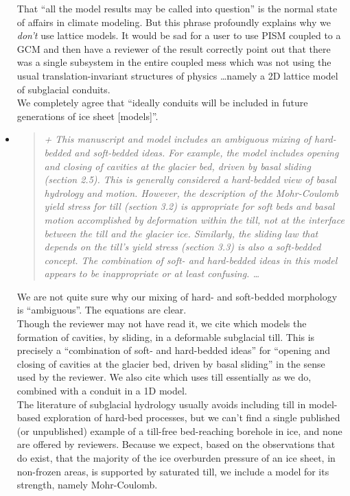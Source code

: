 \documentclass[11pt,reqno]{amsart}
\newcommand{\reply}[2]{
\medskip\medskip
\item  \begin{quote}
\emph{#1}
\end{quote}

\medskip
\noindent #2}
\begin{document}
\begin{itemize}
{\indent That ``all the model results may be called into question'' is the normal state of affairs in climate modeling.  But this phrase profoundly explains why we \emph{don't} use lattice models.  It would be sad for a user to use PISM coupled to a GCM and then have a reviewer of the result correctly point out that there was a single subsystem in the entire coupled mess which was not using the usual translation-invariant structures of physics \dots namely a 2D lattice model of subglacial conduits.\\
\indent We completely agree that ``ideally conduits will be included in future
generations of ice sheet [models]''.}

\reply{+ This manuscript and model includes an ambiguous mixing of hard-bedded and soft-bedded ideas. For example, the model includes opening and closing of cavities at
the glacier bed, driven by basal sliding (section 2.5).  This is generally considered
a hard-bedded view of basal hydrology and motion.  However, the description of the
Mohr-Coulomb yield stress for till (section 3.2) is appropriate for soft beds and basal
motion accomplished by deformation \emph{within} the till, not at the interface between the
till and the glacier ice. Similarly, the sliding law that depends on the till's yield stress
(section 3.3) is also a soft-bedded concept. The combination of soft- and hard-bedded
ideas in this model appears to be inappropriate or at least confusing. \dots}
{We are not quite sure why our mixing of hard- and soft-bedded morphology is ``ambiguous''.  The equations are clear.\\
\indent Though the reviewer may not have read it, we cite \cite{Schoof2007deformable} which models the formation of cavities, by sliding, in a deformable subglacial till.  This is precisely a ``combination of soft- and hard-bedded ideas'' for ``opening and closing of cavities at the glacier bed, driven by basal sliding'' in the sense used by the reviewer.  We also cite \cite{vanderWeletal2013} which uses till essentially as we do, combined with a conduit in a 1D model. \\
\indent The literature of subglacial hydrology usually avoids including till in model-based exploration of hard-bed processes, but we can't find a single published (or unpublished) example of a till-free bed-reaching borehole in ice, and none are offered by reviewers.  Because we expect, based on the observations that do exist, that the majority of the ice overburden pressure of an ice sheet, in non-frozen areas, is supported by saturated till, we include a model for its strength, namely Mohr-Coulomb. \\
}
\end{itemize}
\end{document}
